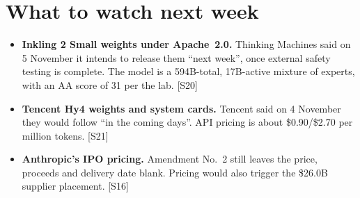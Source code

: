 \documentclass[11pt,a4paper]{article}
\newcommand{\srcref}[1]{\textcolor{brandaccent}{[S#1]}}
\begin{document}
\section{What to watch next week}

\begin{itemize}
  \item \textbf{Inkling 2 Small weights under Apache~2.0.} Thinking Machines said on 5 November it intends to release them ``next week'', once external safety testing is complete. The model is a 594B-total, 17B-active mixture of experts, with an AA score of 31 per the lab. \srcref{20}
  \item \textbf{Tencent Hy4 weights and system cards.} Tencent said on 4 November they would follow ``in the coming days''. API pricing is about \$0.90/\$2.70 per million tokens. \srcref{21}
  \item \textbf{Anthropic's IPO pricing.} Amendment No.\ 2 still leaves the price, proceeds and delivery date blank. Pricing would also trigger the \$26.0B supplier placement. \srcref{16}
\end{itemize}

\end{document}

